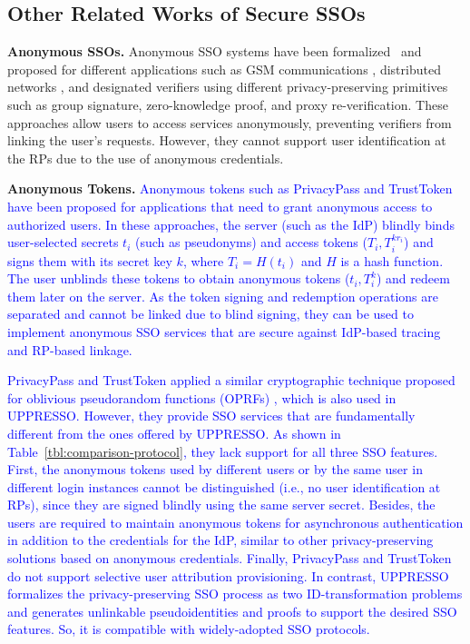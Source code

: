 \subsection{Other Related Works of Secure SSOs}
\label{sec:related}

\noindent\textbf{Anonymous SSOs.} Anonymous SSO systems have been formalized~\cite{WangWS13} and proposed for different applications such as GSM communications \cite{ElmuftiWRR08}, distributed networks \cite{WangWS13}, and designated verifiers \cite{HanCSTW18, HanCSTWW20} using different privacy-preserving primitives such as group signature, zero-knowledge proof, and proxy re-verification. These approaches allow users to access services anonymously, preventing verifiers from linking the user's requests. However, they cannot support user identification at the RPs due to the use of anonymous credentials.

%
\noindent\textbf{Anonymous Tokens.}
\textcolor{blue}{Anonymous tokens such as PrivacyPass and TrustToken \cite{privacypass, trusttoken} have been proposed for applications that need to grant anonymous access to authorized users. In these approaches, the server (such as the IdP) blindly binds user-selected secrets $t_i$ (such as pseudonyms) and access tokens ($T_i, T_i^{k{r_i}}$) and signs them with its secret key $k$, where $T_i=H(t_i)$ and $H$ is a hash function. The user unblinds these tokens to obtain anonymous tokens ($t_i, T_i^k$) and redeem them later on the server. As the token signing and redemption operations are separated and cannot be linked due to blind signing, they can be used to implement anonymous SSO services that are secure against IdP-based tracing and RP-based linkage.
}

\textcolor{blue}{PrivacyPass and TrustToken applied a similar cryptographic technique proposed for oblivious pseudorandom functions (OPRFs) \cite{oprf-proved}, which is also used in UPPRESSO. However, they provide SSO services that are fundamentally different from the ones offered by UPPRESSO. As shown in Table~\ref{tbl:comparison-protocol}, they lack support for all three SSO features. First, the anonymous tokens used by different users or by the same user in different login instances cannot be distinguished (i.e., no user identification at RPs), since they are signed blindly using the same server secret. Besides, the users are required to maintain anonymous tokens for asynchronous authentication in addition to the credentials for the IdP, similar to other privacy-preserving solutions based on anonymous credentials. Finally, PrivacyPass and TrustToken do not support selective user attribution provisioning. In contrast, UPPRESSO formalizes the privacy-preserving SSO process as two ID-transformation problems and generates unlinkable pseudoidentities and proofs to support the desired SSO features. So, it is compatible with widely-adopted SSO protocols.
}

